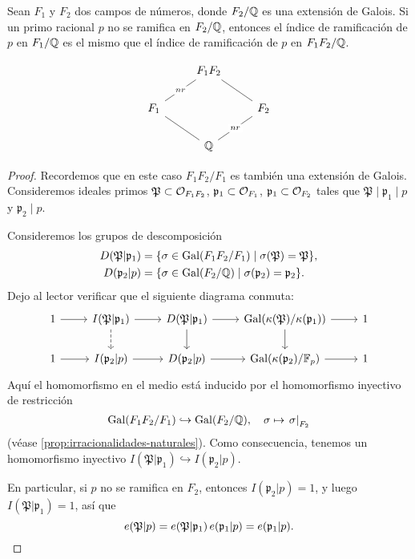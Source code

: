 \begin{lema}
  Sean $F_1$ y $F_2$ dos campos de números, donde $F_2/\mathbb{Q}$ es una extensión de
  Galois. Si un primo racional $p$ no se ramifica en $F_2/\mathbb{Q}$, entonces
  el índice de ramificación de $p$ en $F_1/\mathbb{Q}$ es el mismo que el índice
  de ramificación de $p$ en $F_1 F_2/\mathbb{Q}$.

  \[ \begin{tikzcd}
    & F_1 F_2\ar[-]{dl}[description]{nr}\ar[-]{dr} \\
    F_1\ar[-]{dr} & & F_2\ar[-]{dl}[description]{nr} \\
    & \QQ
  \end{tikzcd} \]

  \begin{proof}
    Recordemos que en este caso $F_1 F_2/F_1$ es también una extensión de
    Galois. Consideremos ideales primos
    $\mathfrak{P} \subset \mathcal{O}_{F_1 F_2}$,
    $\mathfrak{p}_1 \subset \mathcal{O}_{F_1}$,
    $\mathfrak{p}_1 \subset \mathcal{O}_{F_2}$
    tales que
    $\mathfrak{P} \mid \mathfrak{p}_1 \mid p$ y
    $\mathfrak{p}_2 \mid p$.

    Consideremos los grupos de descomposición
    \begin{align*}
      D (\mathfrak{P}|\mathfrak{p}_1) & = \{ \sigma \in \operatorname{Gal} (F_1 F_2/F_1) \mid \sigma (\mathfrak{P}) = \mathfrak{P} \}, \\
      D (\mathfrak{p}_2|p) & = \{ \sigma \in \operatorname{Gal} (F_2/\mathbb{Q}) \mid \sigma (\mathfrak{p}_2) = \mathfrak{p}_2 \}.
    \end{align*}
    Dejo al lector verificar que el siguiente diagrama conmuta:
    \[ \begin{tikzcd}
      1 \ar{r} & I (\mathfrak{P}|\mathfrak{p}_1)\ar[dashed]{d}\ar{r} & D (\mathfrak{P}|\mathfrak{p}_1) \ar{r}\ar{d} & \Gal (\kappa(\mathfrak{P})/\kappa(\mathfrak{p}_1)) \ar{r}\ar{d} & 1 \\
      1 \ar{r} & I (\mathfrak{p}_2|p)\ar{r} & D (\mathfrak{p}_2|p) \ar{r} & \Gal (\kappa(\mathfrak{p}_2)/\FF_p) \ar{r} & 1
    \end{tikzcd} \]
    Aquí el homomorfismo en el medio está inducido por el homomorfismo
    inyectivo de restricción
    \[ \operatorname{Gal} (F_1 F_2/F_1) \hookrightarrow \operatorname{Gal} (F_2/\mathbb{Q}),
    \quad \sigma \mapsto \left.\sigma\right|_{F_2} \]
    (véase \ref{prop:irracionalidades-naturales}). Como consecuencia, tenemos
    un homomorfismo inyectivo
    $I (\mathfrak{P}|\mathfrak{p}_1) \hookrightarrow I (\mathfrak{p}_2|p)$.

    En particular, si $p$ no se ramifica en $F_2$, entonces
    $I (\mathfrak{p}_2|p) = 1$, y luego $I (\mathfrak{P}|\mathfrak{p}_1) = 1$,
    así que
    \[ e (\mathfrak{P}|p) =
       e (\mathfrak{P}|\mathfrak{p}_1)\,e (\mathfrak{p}_1|p) =
       e (\mathfrak{p}_1|p). \qedhere\]
  \end{proof}
\end{lema}

